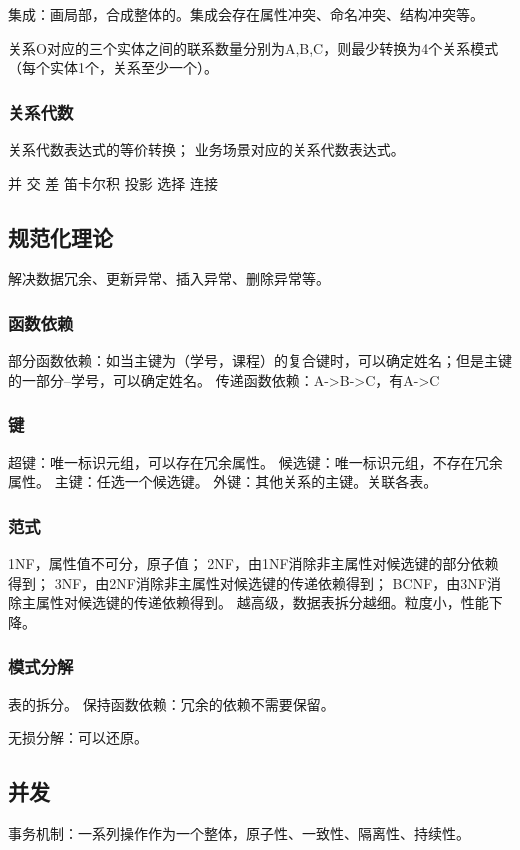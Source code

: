 \documentclass[UTF8]{../computerUniverse}
\begin{document}
集成：画局部，合成整体的。集成会存在属性冲突、命名冲突、结构冲突等。

关系O对应的三个实体之间的联系数量分别为A,B,C，则最少转换为4个关系模式（每个实体1个，关系至少一个）。

\subsubsection{关系代数}

关系代数表达式的等价转换；
业务场景对应的关系代数表达式。

并
交
差
笛卡尔积
投影
选择
连接

\subsection{规范化理论}
解决数据冗余、更新异常、插入异常、删除异常等。

\subsubsection{函数依赖}
部分函数依赖：如当主键为（学号，课程）的复合键时，可以确定姓名；但是主键的一部分--学号，可以确定姓名。
传递函数依赖：A->B->C，有A->C


\subsubsection{键}
超键：唯一标识元组，可以存在冗余属性。
候选键：唯一标识元组，不存在冗余属性。
主键：任选一个候选键。
外键：其他关系的主键。关联各表。

\subsubsection{范式}
1NF，属性值不可分，原子值；
2NF，由1NF消除非主属性对候选键的部分依赖得到；
3NF，由2NF消除非主属性对候选键的传递依赖得到；
BCNF，由3NF消除主属性对候选键的传递依赖得到。
越高级，数据表拆分越细。粒度小，性能下降。

\subsubsection{模式分解}
表的拆分。
保持函数依赖：冗余的依赖不需要保留。

无损分解：可以还原。

\subsection{并发}
事务机制：一系列操作作为一个整体，原子性、一致性、隔离性、持续性。
\end{document}
